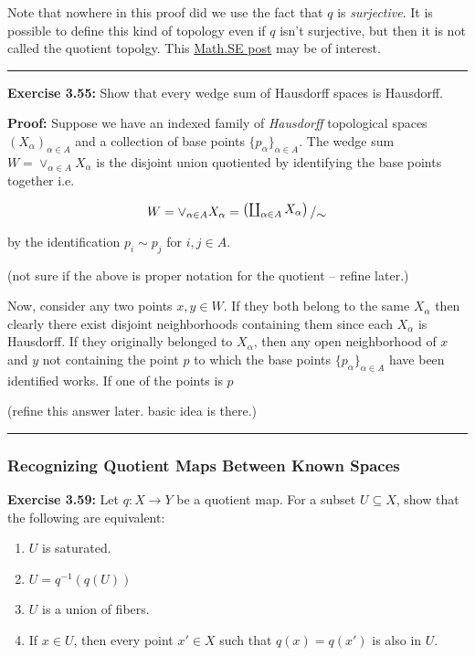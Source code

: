 \documentclass{article}
\newcommand{\bigslant}[2]{{\raisebox{.2em}{$#1$}\left/\raisebox{-.2em}{$#2$}\right.}}
\begin{document}
\vskip 0.5cm
Note that nowhere in this proof did we use the fact that $q$ is \emph{surjective}. It is possible to define this kind of topology even if $q$ isn't surjective, but then it is not called the quotient topolgy. This \href{https://math.stackexchange.com/questions/2608654/proof-that-a-quotient-topology-is-indeed-a-topology}{Math.SE post} may be of interest.

\vskip 0.5cm
\hrule
\vskip 0.5cm

\textbf{Exercise 3.55:} Show that every  wedge sum of Hausdorff spaces is Hausdorff.

\vskip 0.5cm

\textbf{Proof:} Suppose we have an indexed family of \emph{Hausdorff} topological spaces $(X_{\alpha})_{\alpha \in A}$ and a collection of base points $\{p_{\alpha}\}_{\alpha \in A}$. The wedge sum $W = \vee_{\alpha \in A} X_{\alpha}$ is the disjoint union quotiented by identifying the base points together i.e.

\[ W = \vee_{\alpha \in A} X_{\alpha} = \bigslant{\left(\coprod_{\alpha \in A} X_{\alpha} \right)}{ \sim } \]

by the identification $p_{i} \sim p_{j}$ for $i,j \in A$.

(not sure if the above is proper notation for the quotient -- refine later.)

\vskip 0.5cm
Now, consider any two points $x, y \in W$. If they both belong to the same $X_{\alpha}$ then clearly there exist disjoint neighborhoods containing them since each $X_{\alpha}$ is Hausdorff. If they originally belonged to $X_{\alpha}$, then any open neighborhood of $x$ and $y$ not containing the point $p$ to which the base points $\{p_{\alpha}\}_{\alpha \in A}$ have been identified works. If one of the points is $p$

\vskip 0.5cm
(refine this answer later. basic idea is there.)

\vskip 0.5cm
\hrule
\vskip 0.5cm

\subsubsection{Recognizing Quotient Maps Between Known Spaces}

\textbf{Exercise 3.59:} Let $q : X \rightarrow Y$ be a quotient map. For a subset $U \subseteq X$, show that the following are equivalent:
\begin{enumerate}
  \item $U$ is saturated.
  \item $U = q^{-1}(q(U))$
  \item $U$ is a union of fibers.
  \item If $x \in U$, then every point $x' \in X$ such that $q(x) = q(x')$ is also in $U$.
\end{enumerate}
\end{document}
